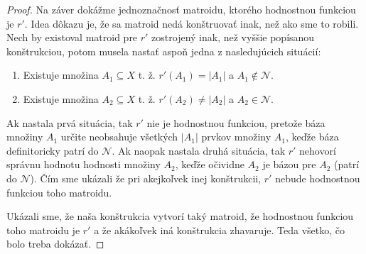 \begin{proof}
	\medskip
	Na záver dokážme jednoznačnosť matroidu, ktorého hodnostnou funkciou je $r'$. Idea dôkazu je, že sa matroid nedá konštruovať inak, než ako sme to robili.
	Nech by existoval matroid pre $r'$ zostrojený inak, než vyššie popísanou konštrukciou, potom musela nastať aspoň jedna z nasledujúcich situácií:
	\begin{enumerate}
	\itemsep0em
	\item	Existuje množina $A_1 \subseteq X$ t. ž.	$r'(A_1)=|A_1|$ a $A_1 \notin \mathcal{N}$.
	\item	Existuje množina $A_2 \subseteq X$ t. ž.	$r'(A_2)\ne|A_2|$ a $A_2 \in \mathcal{N}$.
	\end{enumerate}
	Ak nastala prvá situácia, tak $r'$ nie je hodnostnou funkciou, pretože báza množiny $A_1$ určite neobsahuje všetkých $|A_1|$ prvkov množiny $A_1$, keďže báza definitoricky patrí do $\mathcal{N}$.	Ak naopak nastala druhá situácia, tak $r'$ nehovorí správnu hodnotu hodnosti množiny $A_2$, keďže očividne $A_2$ je bázou pre $A_2$	(patrí do $\mathcal{N}$). Čím sme ukázali že pri akejkoľvek inej konštrukcii, $r'$ nebude hodnostnou funkciou toho matroidu.

	\medskip
	Ukázali sme, že naša konštrukcia vytvorí taký matroid, že hodnostnou funkciou toho matroidu je $r'$ a že akákoľvek iná konštrukcia zhavaruje. Teda všetko, čo bolo treba dokázať.
\end{proof}

